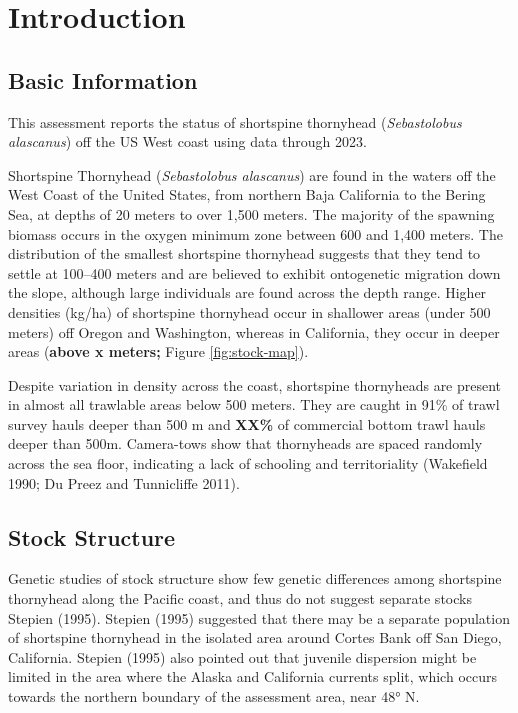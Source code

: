 \documentclass[11pt,
  english,
  letterpaper,
]{article}
\begin{document}
\pagebreak
\setlength{\parskip}{5mm plus1mm minus1mm}
\setcounter{page}{1}
\renewcommand{\thefigure}{\arabic{figure}}
\renewcommand{\thetable}{\arabic{table}}
\setcounter{table}{0}
\setcounter{figure}{0}

\hypertarget{introduction}{%
\section{Introduction}\label{introduction}}

\hypertarget{basic-information}{%
\subsection{Basic Information}\label{basic-information}}

This assessment reports the status of shortspine thornyhead (\emph{Sebastolobus alascanus}) off the US West coast using data through 2023.

Shortspine Thornyhead (\emph{Sebastolobus alascanus}) are found in the waters off the West Coast of the United States, from northern Baja California to the Bering Sea, at depths of 20 meters to over 1,500 meters. The majority of the spawning biomass occurs in the oxygen minimum zone between 600 and 1,400 meters. The distribution of the smallest shortspine thornyhead suggests that they tend to settle at 100--400 meters and are believed to exhibit ontogenetic migration down the slope, although large individuals are found across the depth range. Higher densities (kg/ha) of shortspine thornyhead occur in shallower areas (under 500 meters) off Oregon and Washington, whereas in California, they occur in deeper areas (\textbf{above x meters;} Figure \ref{fig:stock-map}).

Despite variation in density across the coast, shortspine thornyheads are present in almost all trawlable areas below 500 meters. They are caught in 91\% of trawl survey hauls deeper than 500 m and \textbf{XX\%} of commercial bottom trawl hauls deeper than 500m. Camera-tows show that thornyheads are spaced randomly across the sea floor, indicating a lack of schooling and territoriality (Wakefield 1990; Du Preez and Tunnicliffe 2011).

\hypertarget{stock-structure}{%
\subsection{Stock Structure}\label{stock-structure}}

Genetic studies of stock structure show few genetic differences among shortspine thornyhead along the Pacific coast, and thus do not suggest separate stocks Stepien (1995). Stepien (1995) suggested that there may be a separate population of shortspine thornyhead in the isolated area around Cortes Bank off San Diego, California. Stepien (1995) also pointed out that juvenile dispersion might be limited in the area where the Alaska and California currents split, which occurs towards the northern boundary of the assessment area, near 48° N.
\end{document}
